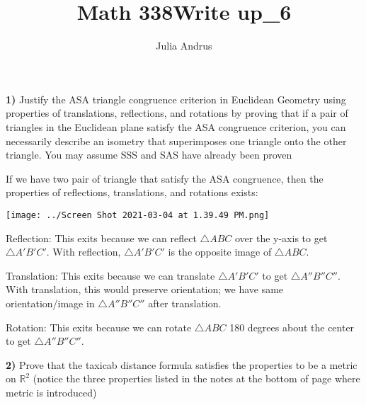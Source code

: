 \documentclass{article}
\title{Math 338\:Write up\_6}
\author{Julia Andrus}
\date{}
\begin{document}
\maketitle

\textbf{1)} Justify the ASA triangle congruence criterion in Euclidean Geometry using properties of translations, reflections, and rotations by proving that if a pair of triangles in the Euclidean plane satisfy the ASA congruence criterion, you can necessarily describe an isometry that superimposes one triangle onto the other triangle.  You may assume SSS and SAS have already been proven

\vspace{2mm}

If we have two pair of triangle that satisfy the ASA congruence, then the properties of  reflections, translations, and rotations exists:

\vspace{2mm}


\texttt{[image: ../Screen Shot 2021-03-04 at 1.39.49 PM.png]}

\vspace{2mm}

Reflection: This exits because we can reflect $\triangle ABC$ over the y-axis to get $\triangle A'B'C'$. With reflection, $\triangle A'B'C'$ is the opposite image of $\triangle ABC$.

\vspace{2mm}

Translation: This exits because we can translate $\triangle A'B'C'$ to get $\triangle A''B''C''$. With translation, this would preserve orientation; we have same orientation/image in $\triangle A''B''C''$ after translation. 

\vspace{2mm}

Rotation: This exits because we can rotate $\triangle ABC$ 180 degrees about the center to get $\triangle A''B''C''$. 












\newpage
\textbf{2)}  Prove that the taxicab distance formula satisfies the properties to be a metric on $\mathbb{R}^{2}$ (notice the three properties listed in the notes at the bottom of page where metric is introduced)
\end{document}
